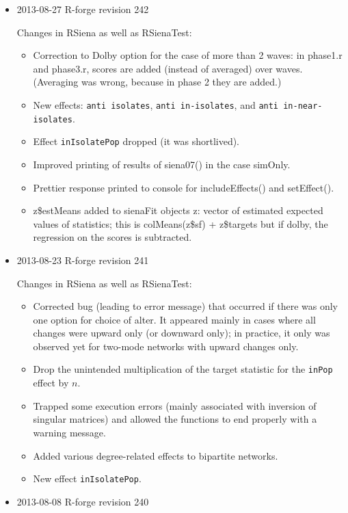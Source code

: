 \documentclass[a4paper,fleqn,11pt]{article}
\newcommand{\+}{\, + \,}
\newcommand{\sfn}[1]{\textsf{#1}}
\begin{document}
{\begin{small}
\begin{itemize}
\item 2013-08-27 R-forge revision 242

Changes in RSiena as well as RSienaTest:
  \begin{itemize}
  \item Correction to Dolby option for the case of more than 2 waves:
     in \sfn{phase1.r} and \sfn{phase3.r}, scores are added
     (instead of averaged) over waves.
     (Averaging was wrong, because in phase 2 they are added.)
  \item New effects: \texttt{anti isolates}, \texttt{anti in-isolates},
   and \texttt{anti in-near-isolates}.
  \item Effect \texttt{inIsolatePop} dropped (it was shortlived).
  \item Improved printing of results of \sfn{siena07()} in the case
    \sfn{simOnly}.
  \item Prettier response printed to console for \sfn{includeEffects()} and
        \sfn{setEffect()}.
  \item \sfn{z\$estMeans} added to sienaFit objects \sfn{z}:
     vector of estimated expected values of statistics;
	 this is \sfn{colMeans(z\$sf) + z\$targets}  but if dolby,
	 the regression on the scores is subtracted.
  \end{itemize}


\item 2013-08-23 R-forge revision 241

Changes in RSiena as well as RSienaTest:
  \begin{itemize}
  \item Corrected bug (leading to error message)
     that occurred if there was only one option
     for choice of alter. It appeared mainly in cases where all changes
     were upward only (or downward only); in practice, it only was observed
     yet for two-mode networks with upward changes only.
  \item  Drop the unintended multiplication of the target statistic
     for the \texttt{inPop} effect by $n$.
  \item Trapped some execution errors (mainly associated with inversion of
    singular matrices) and allowed the functions to end properly
    with a warning message.
  \item Added various degree-related effects to bipartite networks.
  \item New effect \texttt{inIsolatePop}.
  \end{itemize}

\item 2013-08-08 R-forge revision 240


\end{itemize}
\end{small}}
\end{document}
